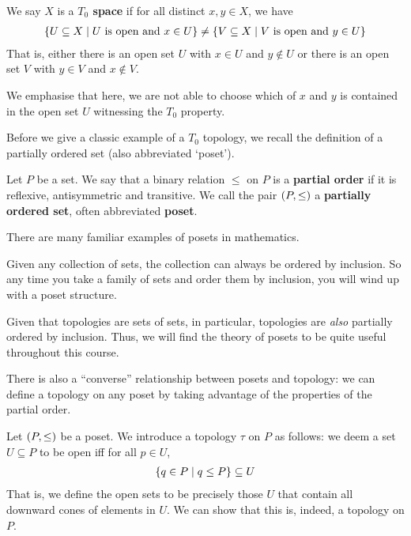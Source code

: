 \begin{boxdefinition}[$T_0$ property]
    We say $X$ is a \textbf{$T_0$ space} if for all distinct $x, y \in X$, we have
    \begin{align*}
        \left\{ U \subseteq X \; \middle\vert \; U \text{ is open and } x \in U \right\}
        \neq
        \left\{ V \subseteq X \; \middle\vert \; V \text{ is open and } y \in U \right\}
    \end{align*}
    That is, either there is an open set $U$ with $x \in U$ and $y \notin U$ or there is an open set $V$ with $y \in V$ and $x \notin V$.
\end{boxdefinition}
\begin{remark}
    We emphasise that here, we are not able to choose which of $x$ and $y$ is contained in the open set $U$ witnessing the $T_0$ property.
\end{remark}

Before we give a classic example of a $T_0$ topology, we recall the definition of a partially ordered set (also abbreviated `poset').

\begin{boxdefinition}
    Let $P$ be a set. We say that a binary relation $\leq$ on $P$ is a \textbf{partial order} if it is reflexive, antisymmetric and transitive. We call the pair $\left( P, \leq \right)$ a \textbf{partially ordered set}, often abbreviated \textbf{poset}.
\end{boxdefinition}

There are many familiar examples of posets in mathematics.

\begin{boxexample}
    Given any collection of sets, the collection can always be ordered by inclusion. So any time you take a family of sets and order them by inclusion, you will wind up with a poset structure.
\end{boxexample}

Given that topologies are sets of sets, in particular, topologies are \textit{also} partially ordered by inclusion. Thus, we will find the theory of posets to be quite useful throughout this course.

There is also a ``converse'' relationship between posets and topology: we can define a topology on any poset by taking advantage of the properties of the partial order.

\begin{boxexample}\label{Ch1:Eg:Poset_Downward_Cone}
    Let $\left( P, \leq \right)$ be a poset. We introduce a topology $\tau$ on $P$ as follows: we deem a set $U \subseteq P$ to be open iff for all $p \in U$,
    \begin{align*}
        \left\{ q \in P \; \middle\vert \; q \leq P \right\} \subseteq U
    \end{align*}
    That is, we define the open sets to be precisely those $U$ that contain all downward cones of elements in $U$. We can show that this is, indeed, a topology on $P$.
\end{boxexample}


